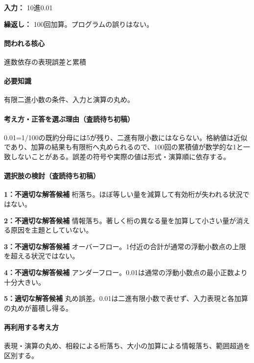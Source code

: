 \noindent\textbf{入力：} 10進0.01\par

\noindent\textbf{繰返し：} 100回加算。プログラムの誤りはない。\par

\paragraph{問われる核心} 進数依存の表現誤差と累積

\paragraph{必要知識} 有限二進小数の条件、入力と演算の丸め。

\paragraph{考え方・正答を選ぶ理由（査読待ち初稿）} 0.01=\allowbreak{}1/100の既約分母には5が残り、二進有限小数にはならない。格納値は近似であり、加算の結果も有限桁へ丸められるので、100回の累積値が数学的な1と一致しないことがある。誤差の符号や実際の値は形式・演算順に依存する。

\paragraph{選択肢の検討（査読待ち初稿）}\mbox{}\par

\noindent\textbf{1：不適切な解答候補} 桁落ち。ほぼ等しい量を減算して有効桁が失われる状況ではない。\par

\noindent\textbf{2：不適切な解答候補} 情報落ち。著しく桁の異なる量を加算して小さい量が消える原因を主題としていない。\par

\noindent\textbf{3：不適切な解答候補} オーバーフロー。1付近の合計が通常の浮動小数点の上限を超える状況ではない。\par

\noindent\textbf{4：不適切な解答候補} アンダーフロー。0.01は通常の浮動小数点の最小正数より十分大きい。\par

\noindent\textbf{5：適切な解答候補} 丸め誤差。0.01は二進有限小数で表せず、入力表現と各加算の丸めが蓄積し得る。\par

\paragraph{再利用する考え方} 表現・演算の丸め、相殺による桁落ち、大小の加算による情報落ち、範囲超過を区別する。

